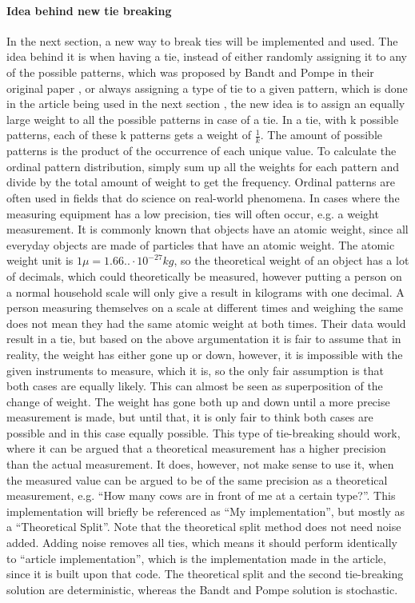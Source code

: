 \FloatBarrier

\paragraph{Idea behind new tie breaking}
In the next section, a new way to break ties will be implemented and used. The idea behind it is when having a tie, instead of either randomly assigning it to any of the possible patterns, which was proposed by Bandt and Pompe in their original paper \cite{Bandt2002}, or always assigning a type of tie to a given pattern, which is done in the article being used in the next section \cite{Chagas2022}, the new idea is to assign an equally large weight to all the possible patterns in case of a tie. In a tie, with k possible patterns, each of these k patterns gets a weight of $\frac{1}{k}$. The amount of possible patterns is the product of the occurrence of each unique value. To calculate the ordinal pattern distribution, simply sum up all the weights for each pattern and divide by the total amount of weight to get the frequency. Ordinal patterns are often used in fields that do science on real-world phenomena. In cases where the measuring equipment has a low precision, ties will often occur, e.g. a weight measurement. It is commonly known that objects have an atomic weight, since all everyday objects are made of particles that have an atomic weight. The atomic weight unit is $1\mu = 1.66..\cdot10^{-27}kg$, so the theoretical weight of an object has a lot of decimals, which could theoretically be measured, however putting a person on a normal household scale will only give a result in kilograms with one decimal. A person measuring themselves on a scale at different times and weighing the same does not mean they had the same atomic weight at both times. Their data would result in a tie, but based on the above argumentation it is fair to assume that in reality, the weight has either gone up or down, however, it is impossible with the given instruments to measure, which it is, so the only fair assumption is that both cases are equally likely. This can almost be seen as superposition\cite{Schroedinger1926} of the change of weight. The weight has gone both up and down until a more precise measurement is made, but until that, it is only fair to think both cases are possible and in this case equally possible. This type of tie-breaking should work, where it can be argued that a theoretical measurement has a higher precision than the actual measurement. It does, however, not make sense to use it, when the measured value can be argued to be of the same precision as a theoretical measurement, e.g. “How many cows are in front of me at a certain type?”. This implementation will briefly be referenced as “My implementation”, but mostly as a “Theoretical Split”. Note that the theoretical split method does not need noise added. Adding noise removes all ties, which means it should perform identically to “article implementation”, which is the implementation made in the article\cite{Chagas2022}, since it is built upon that code. The theoretical split and the second tie-breaking solution are deterministic, whereas the Bandt and Pompe solution is stochastic.

